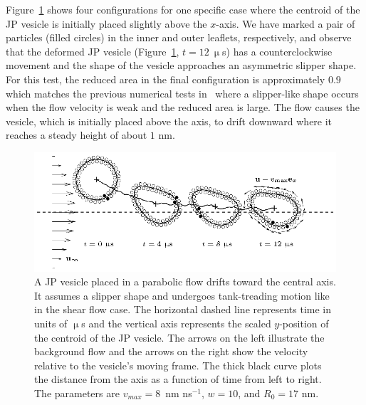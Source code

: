 \documentclass[lineno]{jfm}
\begin{document}

Figure~\ref{figure6} shows four configurations for one specific case
where the centroid of the JP vesicle is initially placed slightly above
the $x$-axis. We have marked a pair of particles (filled circles) in the
inner and outer leaflets, respectively, and observe that the deformed JP
vesicle (Figure~\ref{figure6}, $t = 12~\upmu$s) has a counterclockwise
movement and the shape of the vesicle approaches an asymmetric slipper
shape. For this test, the reduced area in the final configuration is
approximately $0.9$ which matches the previous numerical tests
in~\cite{Kaoui09} where a slipper-like shape occurs when the flow
velocity is weak and the reduced area is large. The flow causes the
vesicle, which is initially placed above the axis, to drift downward
where it reaches a steady height of about $1$ nm. 

\begin{figure}
\centering
\includegraphics[width=\textwidth]{fig6.eps}
  \caption{\label{figure6} A JP vesicle placed in a parabolic flow
  drifts toward the central axis. It assumes a slipper shape and
  undergoes tank-treading motion like in the shear flow case. 
The horizontal dashed line represents time in units of
    $\upmu$s and the vertical axis represents the scaled $y$-position
    of the centroid of the JP vesicle.
  The arrows
  on the left illustrate the background flow and the arrows on the right
  show the velocity relative to the vesicle's moving frame. The thick
  black curve plots the distance from the axis as a function of time
  from left to right. The parameters are $v_{max} = 8$~nm ns$^{-1}$,
  $w=10$, and $R_0=17$ nm.}
\end{figure}
\end{document}
